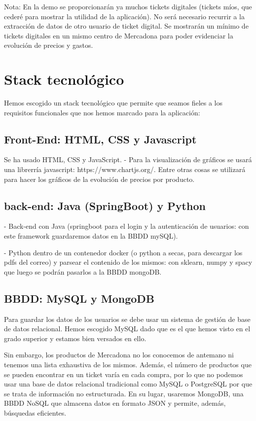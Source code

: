 \documentclass[a4paper,12pt]{report}
\begin{document}
			Nota: En la demo se proporcionarán ya muchos tickets digitales (tickets míos, que cederé para mostrar la utilidad de la aplicación). No será necesario recurrir a la extracción de datos de otro usuario de ticket digital. Se mostrarán un mínimo de tickets digitales en un mismo centro de Mercadona para poder evidenciar la evolución de precios y gastos.
			
		
		\section{Stack tecnológico}
	
		Hemos escogido un stack tecnológico que permite que seamos fieles a los requisitos funcionales que nos hemos marcado para la aplicación:
		
			 \subsection{Front-End: HTML, CSS y Javascript}
			 
			Se ha usado HTML, CSS y JavaScript. - Para la visualización de gráficos se usará una librerría javascript: https://www.chartjs.org/. Entre otras cosas se utilizará para hacer los gráficos de la evolución de precios por producto.
			
	
		 
		\subsection{back-end: Java (SpringBoot) y Python}
		
			- Back-end con Java (springboot para el login y la autenticación de usuarios: con este framework guardaremos datos en la BBDD mySQL).
			
			- Python dentro de un contenedor docker (o python a secas, para descargar los pdfs del correo) y parsear el contenido de los mismos: con sklearn, numpy y spacy que luego se podrán pasarlos a la BBDD mongoDB.
			
		\subsection{BBDD: MySQL y MongoDB}
		
		
		Para guardar los datos de los usuarios se debe usar un sistema de gestión de base de datos relacional. Hemos escogido MySQL dado que es el que hemos visto en el grado superior y estamos bien versados en ello.
		
		Sin embargo, los productos de Mercadona no los conocemos de antemano ni tenemos una lista exhaustiva de los mismos. Además, el número de productos que se pueden encontrar en un ticket varía en cada compra, por lo que no podemos usar una base de datos relacional tradicional como MySQL o PostgreSQL por que se trata de información no estructurada. En su lugar, usaremos MongoDB, una BBDD NoSQL que almacena datos en formato JSON y permite, además, búsquedas eficientes.
		
\end{document}
